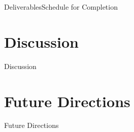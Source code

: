 \documentclass{beamer}
\begin{document}
\begin{frame}{Deliverables}{Schedule for Completion}
  
\end{frame}


\section{Discussion}

\begin{frame}{Discussion}{}
  
\end{frame}


\section{Future Directions}

\begin{frame}{Future Directions}{}
  
\end{frame}



\end{document}
